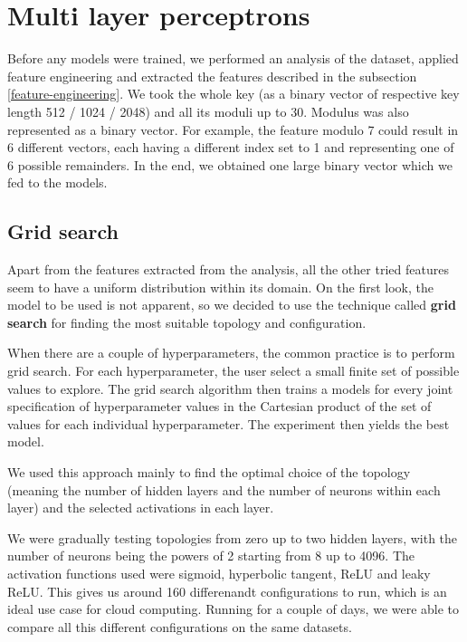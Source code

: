 \section{Multi layer perceptrons}

Before any models were trained, we performed an analysis of the dataset, applied feature engineering and extracted the features described in the subsection \ref{feature-engineering}. We took the whole key (as a binary vector of respective key length 512 / 1024 / 2048) and all its moduli up to 30. Modulus was also represented as a binary vector. For example, the feature modulo 7 could result in 6 different vectors, each having a different index set to 1 and representing one of 6 possible remainders. In the end, we obtained one large binary vector which we fed to the models.

\subsection*{Grid search}

Apart from the features extracted from the analysis, all the other tried features seem to have a uniform distribution within its domain. On the first look, the model to be used is not apparent, so we decided to use the technique called \textbf{grid search}\cite{grid-search} for finding the most suitable topology and configuration. 

When there are a couple of hyperparameters, the common practice is to perform grid search. For each hyperparameter, the user select a small finite set of possible values to explore. The grid search algorithm then trains a models for every joint specification of hyperparameter values in the Cartesian product of the set of values for each individual hyperparameter. The experiment then yields the best model.

We used this approach mainly to find the optimal choice of the topology (meaning the number of hidden layers and the number of neurons within each layer) and the selected activations in each layer.

We were gradually testing topologies from zero up to two hidden layers, with the number of neurons being the powers of 2 starting from 8 up to 4096. The activation functions used were sigmoid, hyperbolic tangent, ReLU and leaky ReLU. This gives us around 160 differenandt configurations to run, which is an ideal use case for cloud computing. Running for a couple of days, we were able to compare all this different configurations on the same datasets.


